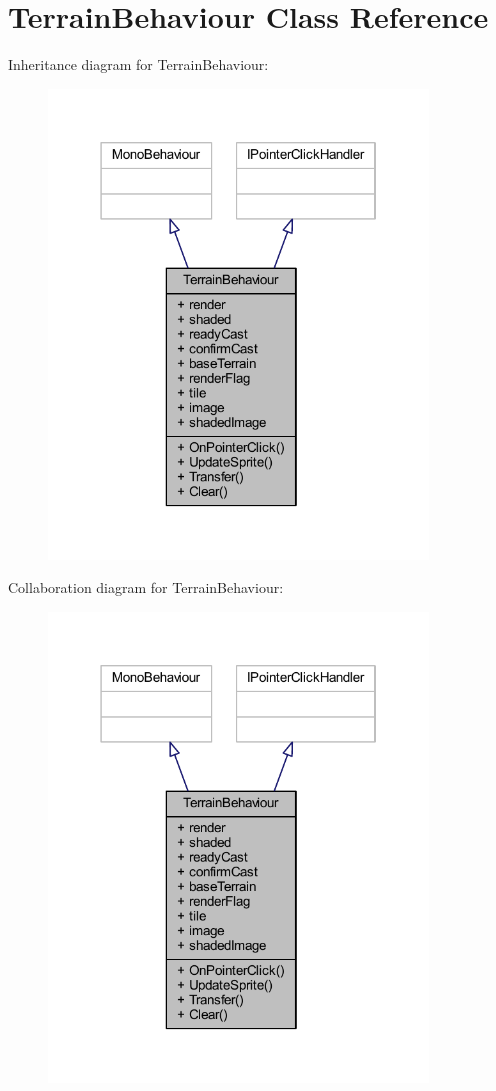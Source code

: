 \hypertarget{class_terrain_behaviour}{}\section{Terrain\+Behaviour Class Reference}
\label{class_terrain_behaviour}


Inheritance diagram for Terrain\+Behaviour\+:\nopagebreak
\begin{figure}[H]
\begin{center}
\leavevmode
\includegraphics[width=286pt]{class_terrain_behaviour__inherit__graph}
\end{center}
\end{figure}


Collaboration diagram for Terrain\+Behaviour\+:\nopagebreak
\begin{figure}[H]
\begin{center}
\leavevmode
\includegraphics[width=286pt]{class_terrain_behaviour__coll__graph}
\end{center}
\end{figure}
